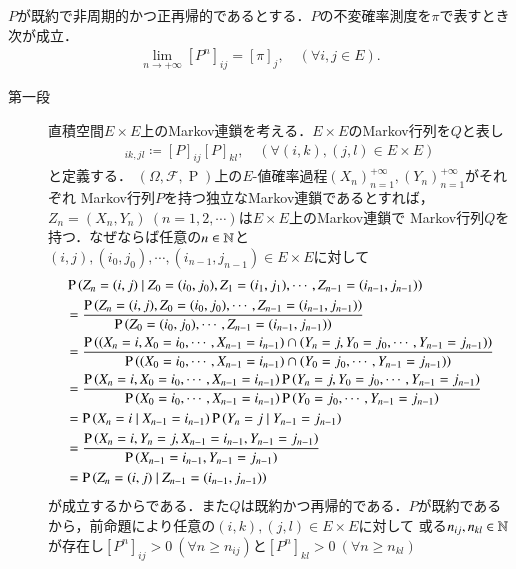 	\begin{thm}[Ergodicity]
		$P$が既約で非周期的かつ正再帰的であるとする．$P$の不変確率測度を$\pi$で表すとき次が成立．
		\begin{align}
			\lim_{n \to +\infty}[P^n]_{ij} = [\pi]_j, \quad (\forall i,j \in E).
		\end{align}
	\end{thm}
	\begin{prf}\mbox{}
	\begin{description}
	\item[第一段]
		直積空間$E \times E$上のMarkov連鎖を考える．$E \times E$のMarkov行列を$Q$と表し
		\begin{align}
			[Q]_{ik,jl} \coloneqq [P]_{ij}[P]_{kl}, \quad (\forall (i,k), (j,l) \in E \times E)
		\end{align}
		と定義する．
		$(\Omega,\mathcal{F},\operatorname{P})$上の$E$-値確率過程$(X_n)_{n=1}^{+\infty}, (Y_n)_{n=1}^{+\infty}$がそれぞれ
		Markov行列$P$を持つ独立なMarkov連鎖であるとすれば，$Z_n=(X_n,Y_n)\ (n=1,2,\cdots)$は$E \times E$上のMarkov連鎖で
		Markov行列$Q$を持つ．なぜならば任意の$n \in \mathbb{N}$と$(i,j),(i_0,j_0),\cdots,(i_{n-1},j_{n-1}) \in E \times E$に対して
		\begin{align}
			&\operatorname{P} \left( Z_n = (i,j) \ \middle|\ Z_0=(i_0,j_0),Z_1=(i_1,j_1), \cdots, Z_{n-1} = (i_{n-1},j_{n-1}) \right) \\
			&= \frac{\operatorname{P} \left(Z_n = (i,j), Z_0=(i_0,j_0),\cdots, Z_{n-1} = (i_{n-1},j_{n-1})\right)}{\operatorname{P} \left(Z_0=(i_0,j_0),\cdots, Z_{n-1} = (i_{n-1},j_{n-1})\right)} \\
			&= \frac{\operatorname{P} \left((X_n=i,X_0=i_0,\cdots, X_{n-1} = i_{n-1})\cap(Y_n=j,Y_0=j_0,\cdots, Y_{n-1}=j_{n-1})\right)}{\operatorname{P} \left((X_0=i_0,\cdots, X_{n-1} = i_{n-1})\cap(Y_0=j_0,\cdots, Y_{n-1}=j_{n-1})\right)} \\
			&= \frac{\operatorname{P} \left(X_n=i,X_0=i_0,\cdots, X_{n-1} = i_{n-1}\right)\operatorname{P} \left(Y_n=j,Y_0=j_0,\cdots, Y_{n-1}=j_{n-1}\right)}{\operatorname{P} \left(X_0=i_0,\cdots, X_{n-1}=i_{n-1}\right)\operatorname{P} \left(Y_0=j_0,\cdots, Y_{n-1}=j_{n-1}\right)} \\
			&= \operatorname{P} \left( X_n = i \ \middle|\ X_{n-1}=i_{n-1} \right)\operatorname{P} \left( Y_n = j \ \middle|\ Y_{n-1}=j_{n-1} \right) \label{eq:ergodic_discrete_1}\\
			&= \frac{\operatorname{P} \left(X_n=i,Y_n=j,X_{n-1}=i_{n-1},Y_{n-1}=j_{n-1}\right)}{\operatorname{P} \left(X_{n-1}=i_{n-1},Y_{n-1}=j_{n-1}\right)} \\
			&= \operatorname{P} \left( Z_n=(i,j) \ \middle|\ Z_{n-1}=(i_{n-1},j_{n-1}) \right)
		\end{align}
		が成立するからである．また$Q$は既約かつ再帰的である．$P$が既約であるから，前命題により任意の$(i,k),(j,l) \in E \times E$に対して
		或る$n_{ij},n_{kl} \in \mathbb{N}$が存在し$[P^n]_{ij} > 0\ (\forall n \geq n_{ij})$と$[P^n]_{kl} > 0\ (\forall n \geq n_{kl})$

\end{description}
\end{prf}
